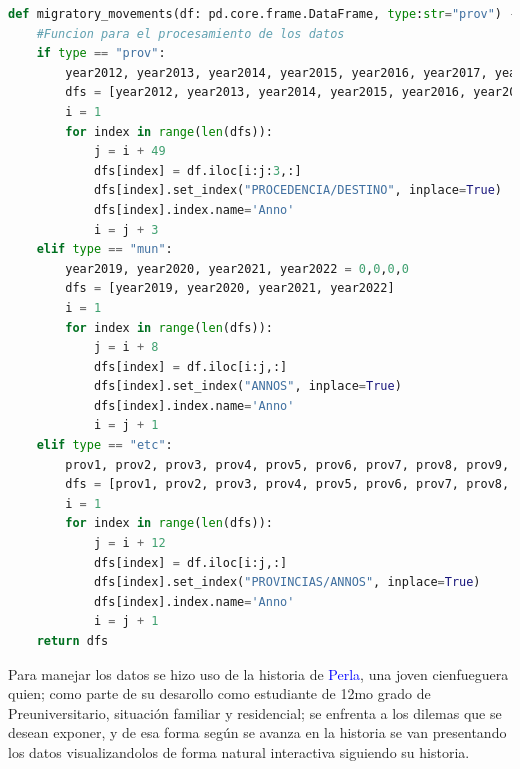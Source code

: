 \documentclass{article}
\begin{document}
\begin{lstlisting}[language=Python, caption=Funcion utilizada para parte del procesamiento de algunos datos]
    def migratory_movements(df: pd.core.frame.DataFrame, type:str="prov") -> list[pd.core.frame.DataFrame]:
    #Funcion para el procesamiento de los datos
    if type == "prov":
        year2012, year2013, year2014, year2015, year2016, year2017, year2018, year2019, year2020, year2021, year2022 = 0,0,0,0,0,0,0,0,0,0,0
        dfs = [year2012, year2013, year2014, year2015, year2016, year2017, year2018, year2019, year2020, year2021, year2022]
        i = 1
        for index in range(len(dfs)):
            j = i + 49
            dfs[index] = df.iloc[i:j:3,:]
            dfs[index].set_index("PROCEDENCIA/DESTINO", inplace=True)
            dfs[index].index.name='Anno'
            i = j + 3
    elif type == "mun":
        year2019, year2020, year2021, year2022 = 0,0,0,0
        dfs = [year2019, year2020, year2021, year2022]
        i = 1
        for index in range(len(dfs)):
            j = i + 8
            dfs[index] = df.iloc[i:j,:]
            dfs[index].set_index("ANNOS", inplace=True)
            dfs[index].index.name='Anno'
            i = j + 1
    elif type == "etc":
        prov1, prov2, prov3, prov4, prov5, prov6, prov7, prov8, prov9, prov10, prov11, prov12, prov13, prov14, prov15 = 0,0,0,0,0,0,0,0,0,0,0,0,0,0,0
        dfs = [prov1, prov2, prov3, prov4, prov5, prov6, prov7, prov8, prov9, prov10, prov11, prov12, prov13, prov14, prov15]
        i = 1
        for index in range(len(dfs)):
            j = i + 12
            dfs[index] = df.iloc[i:j,:]
            dfs[index].set_index("PROVINCIAS/ANNOS", inplace=True)
            dfs[index].index.name='Anno'
            i = j + 1                    
    return dfs
\end{lstlisting}

Para manejar los datos se hizo uso de la historia de \textcolor{blue}{Perla}, una joven cienfueguera quien; como parte de su desarollo como estudiante de 12mo grado de Preuniversitario, situación familiar y residencial; se enfrenta a los dilemas que se desean exponer, y de esa forma según se avanza en la historia se van presentando los datos visualizandolos de forma natural interactiva siguiendo su historia.\\\\
\end{document}

